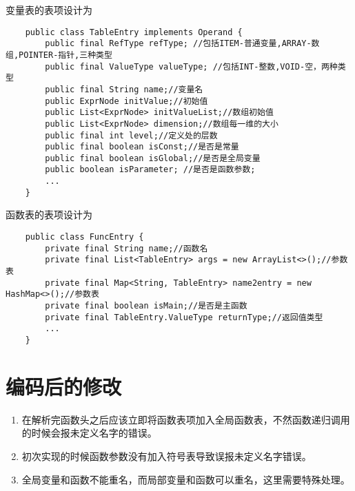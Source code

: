 变量表的表项设计为
\begin{verbatim}
    public class TableEntry implements Operand {
        public final RefType refType; //包括ITEM-普通变量,ARRAY-数组,POINTER-指针,三种类型
        public final ValueType valueType; //包括INT-整数,VOID-空，两种类型
        public final String name;//变量名
        public ExprNode initValue;//初始值
        public List<ExprNode> initValueList;//数组初始值
        public List<ExprNode> dimension;//数组每一维的大小
        public final int level;//定义处的层数
        public final boolean isConst;//是否是常量
        public final boolean isGlobal;//是否是全局变量
        public boolean isParameter; //是否是函数参数;
        ...
    }
\end{verbatim}

函数表的表项设计为
\begin{verbatim}
    public class FuncEntry {
        private final String name;//函数名
        private final List<TableEntry> args = new ArrayList<>();//参数表
        private final Map<String, TableEntry> name2entry = new HashMap<>();//参数表
        private final boolean isMain;//是否是主函数
        private final TableEntry.ValueType returnType;//返回值类型
        ...
    }
\end{verbatim}

\section{编码后的修改}

\begin{enumerate}
    \item 在解析完函数头之后应该立即将函数表项加入全局函数表，不然函数递归调用的时候会报未定义名字的错误。
    \item 初次实现的时候函数参数没有加入符号表导致误报未定义名字错误。
    \item 全局变量和函数不能重名，而局部变量和函数可以重名，这里需要特殊处理。
\end{enumerate}
